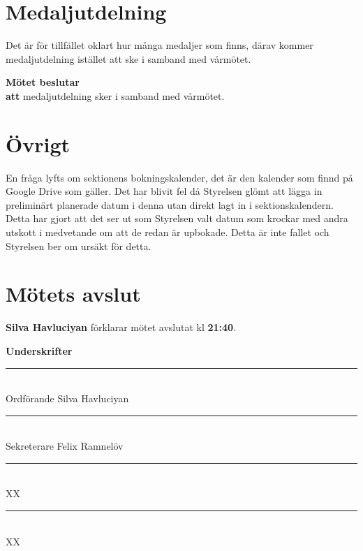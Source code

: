 \documentclass{datateknologsektionen-document}
\newcommand{\ind}{\hspace*{2em}}
\newcommand{\motetbeslutar}{\textbf{Mötet beslutar}}
\newcommand{\att}{\\\ind\textbf{att}}
\begin{document}
\pagebreak

\section{Medaljutdelning}

Det är för tillfället oklart hur många medaljer som finns, därav kommer medaljutdelning istället att ske i samband med vårmötet.

\motetbeslutar\att{} medaljutdelning sker i samband med vårmötet.

\section{Övrigt}

En fråga lyfts om sektionens bokningskalender, det är den kalender som finnd på Google Drive som gäller. Det har blivit fel då Styrelsen 
glömt att lägga in preliminärt planerade datum i denna utan direkt lagt in i sektionskalendern. Detta har gjort att det ser ut som Styrelsen 
valt datum som krockar med andra utskott i medvetande om att de redan är upbokade. Detta är inte fallet och Styrelsen ber om ursäkt för detta. 

\section{Mötets avslut}


\textbf{Silva Havluciyan} förklarar mötet avslutat kl \textbf{21:40}.


\pagebreak
{\Large\bfseries Underskrifter}

\vspace*{1.2cm}
\noindent\rule{8cm}{1pt}\\
Ordförande Silva Havluciyan

\vspace*{1.2cm}
\noindent\rule{8cm}{1pt}\\
Sekreterare Felix Ramnelöv

\vspace*{1.2cm}
\noindent\rule{8cm}{1pt}\\
XX

\vspace*{1.2cm}
\noindent\rule{8cm}{1pt}\\
XX
\end{document}
